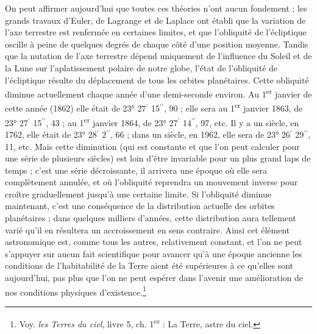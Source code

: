 \documentclass[a4paper, 11pt, oneside]{article}
\begin{document}
On peut affirmer aujourd'hui que toutes ces théories n'ont aucun fondement ; les grands travaux d'Euler, de Lagrange et de Laplace ont établi que la variation de l'axe terrestre est renfermée en certaines limites, et que l'obliquité de l'écliptique oscille à peine de quelques degrés de chaque côté d'une position moyenne. Tandis que la nutation de l'axe terrestre dépend uniquement de l'influence du Soleil et de la Lune sur l'aplatissement polaire de notre globe, l'état de l'obliquité de l'écliptique résulte du déplacement de tous les orbites planétaires. Cette obliquité diminue actuellement chaque année d'une demi-seconde environ. Au 1\textsuperscript{er} janvier de cette année (1862) elle était de 23° 27$^{\prime}$ 15$^{\prime\prime}$, 90 ; elle sera au 1\textsuperscript{er} janvier 1863, de 23° 27$^{\prime}$ 15$^{\prime\prime}$, 43 ; au 1\textsuperscript{er} janvier 1864, de 23° 27$^{\prime}$ 14$^{\prime\prime}$, 97, etc. Il y a un siècle, en 1762, elle était de 23° 28$^{\prime}$ 2$^{\prime\prime}$, 66 ; dans un siècle, en 1962, elle sera de 23° 26$^{\prime}$ 29$^{\prime\prime}$, 11, etc. Mais cette diminution (qui est constante et que l'on peut calculer pour une série de plusieurs siècles) est loin d'être invariable pour un plus grand laps de temps ; c'est une série décroissante, il arrivera une époque où elle sera complètement annulée, et où l'obliquité reprendra un mouvement inverse pour croître graduellement jusqu'à une certaine limite. Si l'obliquité diminue maintenant, c'est une conséquence de la distribution actuelle des orbites planétaires ; dans quelques milliers d'années, cette distribution aura tellement varié qu'il en résultera un accroissement en sens contraire. Ainsi cet élément astronomique est, comme tous les autres, relativement constant, et l'on ne peut s'appuyer sur aucun fait scientifique pour avancer qu'à une époque ancienne les conditions de l'habitabilité de la Terre aient été supérieures à ce qu'elles sont aujourd'hui, pas plus que l'on ne peut espérer dans l'avenir une amélioration de nos conditions physiques d'existence.\footnote{Voy. \emph{les Terres du ciel}, livre 5, ch. 1\textsuperscript{er} : La Terre, astre du ciel.}
\end{document}
